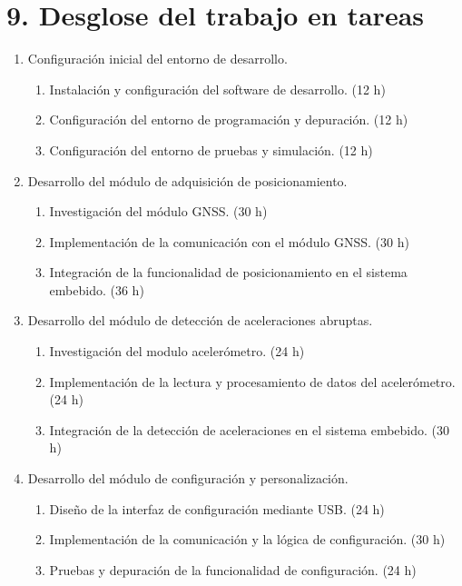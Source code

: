 \documentclass[
11pt, %
codirector, %
]{charter}
\begin{document}
\section{9. Desglose del trabajo en tareas}
\label{sec:wbs}


\begin{enumerate}
    \item Configuración inicial del entorno de desarrollo.
    \begin{enumerate}
        \item Instalación y configuración del software de desarrollo. (12 h)
        \item Configuración del entorno de programación y depuración. (12 h)
        \item Configuración del entorno de pruebas y simulación. (12 h)
    \end{enumerate}
    
    \item Desarrollo del módulo de adquisición de posicionamiento.
    \begin{enumerate}
        \item Investigación del módulo GNSS. (30 h)
        \item Implementación de la comunicación con el módulo GNSS. (30 h)
        \item Integración de la funcionalidad de posicionamiento en el sistema embebido. (36 h)
    \end{enumerate}
    
    \item Desarrollo del módulo de detección de aceleraciones abruptas.
    \begin{enumerate}
        \item Investigación del modulo acelerómetro. (24 h)
        \item Implementación de la lectura y procesamiento de datos del acelerómetro. (24 h)
        \item Integración de la detección de aceleraciones en el sistema embebido. (30 h)
    \end{enumerate}
    
    \item Desarrollo del módulo de configuración y personalización.
    \begin{enumerate}
        \item Diseño de la interfaz de configuración mediante USB. (24 h)
        \item Implementación de la comunicación y la lógica de configuración. (30 h)
        \item Pruebas y depuración de la funcionalidad de configuración. (24 h)
    \end{enumerate}
    

\end{enumerate}
\end{document}
